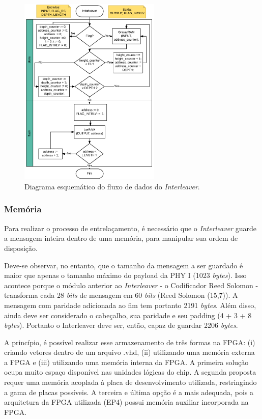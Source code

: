 	\begin{figure}[h!]
		\caption{\label{figure:interleaver-flow}Diagrama esquemático do fluxo de dados do \textit{Interleaver}.}
		\centering
		\includegraphics[width=0.6\textwidth]{interleaver/flow.pdf}
	\end{figure}

	\subsubsection{Memória}
	
	Para realizar o processo de entrelaçamento, é necessário que o \textit{Interleaver} guarde a mensagem inteira dentro de uma memória, para manipular sua ordem de disposição. 
	
	Deve-se observar, no entanto, que o tamanho da mensagem a ser guardado é maior que apenas o tamanho máximo do payload da PHY I (1023 \textit{bytes}). Isso acontece porque o módulo anterior ao \textit{Interleaver} - o Codificador Reed Solomon - transforma cada 28 \textit{bits} de mensagem em 60 \textit{bits} (Reed Solomon (15,7)). A mensagem com paridade adicionada ao fim tem portanto 2191 \textit{bytes}. Além disso, ainda deve ser considerado o cabeçalho, sua paridade e seu padding (4 + 3 + 8 \textit{bytes}). Portanto o Interleaver deve ser, então, capaz de guardar 2206 \textit{bytes}.
	
	A princípio, é possível realizar esse armazenamento de três formas na FPGA: (i) criando vetores dentro de um arquivo .vhd, (ii) utilizando uma memória externa a FPGA e (iii) utilizando uma memória interna da FPGA. A primeira solução ocupa muito espaço disponível nas unidades lógicas do chip. A segunda proposta requer uma memória acoplada à placa de desenvolvimento utilizada, restringindo a gama de placas possíveis. A terceira e última opção é a mais adequada, pois a arquitetura da FPGA utilizada (EP4) possui memória auxiliar incorporada na FPGA.
	
